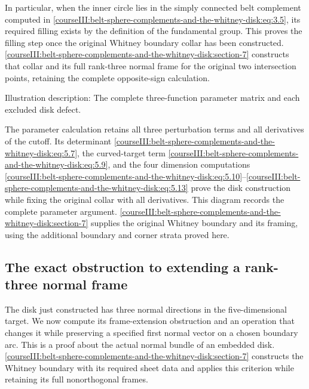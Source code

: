In particular, when the inner circle lies in the simply connected belt complement computed in \eqref{courseIII:belt-sphere-complements-and-the-whitney-disk:eq:3.5}, its required filling exists by the definition of the fundamental group. This proves the filling step once the original Whitney boundary collar has been constructed. \cref{courseIII:belt-sphere-complements-and-the-whitney-disk:section-7} constructs that collar and its full rank-three normal frame for the original two intersection points, retaining the complete opposite-sign calculation.

\label{courseIII:belt-sphere-complements-and-the-whitney-disk:relative-disk-diagram}
Illustration description: The complete three-function parameter matrix and each excluded disk defect.

The parameter calculation retains all three perturbation terms and all derivatives of the cutoff. Its determinant \eqref{courseIII:belt-sphere-complements-and-the-whitney-disk:eq:5.7}, the curved-target term \eqref{courseIII:belt-sphere-complements-and-the-whitney-disk:eq:5.9}, and the four dimension computations \eqref{courseIII:belt-sphere-complements-and-the-whitney-disk:eq:5.10}--\eqref{courseIII:belt-sphere-complements-and-the-whitney-disk:eq:5.13} prove the disk construction while fixing the original collar with all derivatives. This diagram records the complete parameter argument. \cref{courseIII:belt-sphere-complements-and-the-whitney-disk:section-7} supplies the original Whitney boundary and its framing, using the additional boundary and corner strata proved here.

\subsection{The exact obstruction to extending a rank-three normal frame}
\label{courseIII:belt-sphere-complements-and-the-whitney-disk:rank-three-framing}

\label{courseIII:belt-sphere-complements-and-the-whitney-disk:section-6}\label{courseIII:belt-complement:6}

The disk just constructed has three normal directions in the five-dimensional target. We now compute its frame-extension obstruction and an operation that changes it while preserving a specified first normal vector on a chosen boundary arc. This is a proof about the actual normal bundle of an embedded disk. \cref{courseIII:belt-sphere-complements-and-the-whitney-disk:section-7} constructs the Whitney boundary with its required sheet data and applies this criterion while retaining its full nonorthogonal frames.

